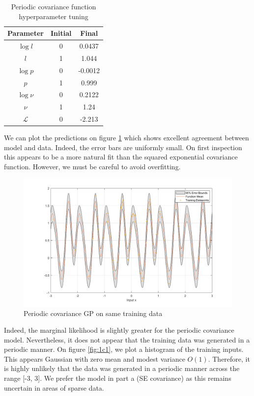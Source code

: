 \documentclass[]{article}
\newcommand{\Lcal}{\mathcal{L}}
\newcommand{\figwidth}{0.6\linewidth}
\begin{document}
\begin{table}[!h]
\centering
\begin{tabular}{c | c c}
	\textbf{Parameter} & \textbf{Initial} & \textbf{Final} \\ \hline
	$\log l$           & 0                & 0.0437         \\
	$l$                & 1                & 1.044          \\
	$\log p$           & 0                & -0.0012        \\
	$p$                & 1                & 0.999          \\
	$\log \nu$         & 0                & 0.2122         \\
	$\nu$              & 1                & 1.24           \\
	$\Lcal$            & 0                & -2.213        
\end{tabular}
\caption{Periodic covariance function hyperparameter tuning}
\label{tab:per}
\end{table}

We can plot the predictions on figure \ref{fig:1c} which shows excellent agreement between model and data. Indeed, the error bars are uniformly small. On first inspection this appears to be a more natural fit than the squared exponential covariance function. However, we must be careful to avoid overfitting.

\begin{figure}[!h]
	\centering
	\includegraphics[width=\figwidth]{1c}
	\caption{Periodic covariance GP on same training data}
	\label{fig:1c}
\end{figure}

Indeed, the marginal likelihood is slightly greater for the periodic covariance model. Nevertheless, it does not appear that the training data was generated in a periodic manner. On figure \ref{fig:1c1}, we plot a histogram of the training inputs. This appears Gaussian with zero mean and modest variance $O(1)$. Therefore, it is highly unlikely that the data was generated in a periodic manner across the range [-3, 3]. We prefer the model in part a (SE covariance) as this remains uncertain in areas of sparse data.
\end{document}
